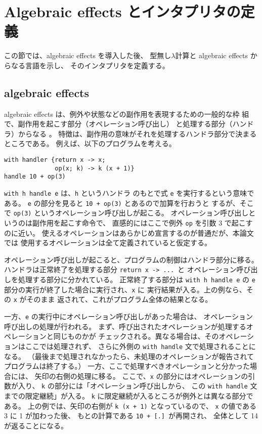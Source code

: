 \section{Algebraic effects とインタプリタの定義}
\label{section:definition}

この節では、algebraic effects を導入した後、
型無し$\lambda$計算と algebraic effects からなる言語を示し、
そのインタプリタを定義する。

\subsection{algebraic effects}
\label{subsection:algebraic effects}

algebraic effects は、例外や状態などの副作用を表現するための一般的な枠
組で、副作用を起こす部分（オペレーション呼び出し）
と処理する部分（ハンドラ）からなる \cite{PRETNAR201519}。
特徴は、副作用の意味がそれを処理するハンドラ部分で決まるところである。
例えば、以下のプログラムを考える。
\begin{verbatim}
with handler {return x -> x;
              op(x; k) -> k (x + 1)}
handle 10 + op(3)
\end{verbatim}
\texttt{with h handle e} は、\texttt{h} というハンドラ
のもとで式 \texttt{e} を実行するという意味である。
\texttt{e} の部分を見ると \texttt{10 + op(3)} とあるので加算を行おうと
するが、そこで \texttt{op(3)} というオペレーション呼び出しが起こる。
オペレーション呼び出しというのは副作用を起こす命令で、
直感的にはここで例外 \texttt{op} を引数 3 で起こすのに近い。
使えるオペレーションはあらかじめ宣言するのが普通だが、本論文では
使用するオペレーションは全て定義されていると仮定する。

オペレーション呼び出しが起こると、プログラムの制御はハンドラ部分に移る。
ハンドラは正常終了を処理する部分 \texttt{return x -> ...}\ と
オペレーション呼び出しを処理する部分に分かれている。
正常終了する部分は
\texttt{with h handle e}
の \texttt{e} 部分の実行が終了した場合に実行され、\texttt{x} に
実行結果が入る。上の例なら、その \texttt{x} がそのまま
返されて、これがプログラム全体の結果となる。

一方、\texttt{e} の実行中にオペレーション呼び出しがあった場合は、
オペレーション呼び出しの処理が行われる。
まず、呼び出されたオペレーションが処理するオペレーションと同じものかが
チェックされる。異なる場合は、そのオペレーションはここでは処理されず、
さらに外側の \texttt{with handle} 文で処理されることになる。
（最後まで処理されなかったら、未処理のオペレーションが報告されて
プログラムは終了する。）
一方、ここで処理すべきオペレーションと分かった場合には、
矢印の右側の処理に移る。
ここで、\texttt{x} の部分にはオペレーションの引数が入り、
\texttt{k} の部分には「オペレーション呼び出しから、
この \texttt{with handle} 文までの限定継続」が入る。
\texttt{k} に限定継続が入るところが例外とは異なる部分である。
上の例では、矢印の右側が \texttt{k (x + 1)} となっているので、
\texttt{x} の値である 3 に 1 が加わった後、
もとの計算である \texttt{10 + [.]}\ が再開され、
全体として 14 が返ることになる。

